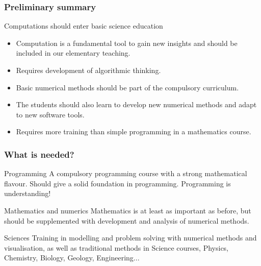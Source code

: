 \documentclass{beamer}
\begin{document}
\begin{frame}
\frametitle{Preliminary summary}

\begin{block}{Computations should enter basic science education }

\begin{itemize}
\item Computation is a fundamental tool to gain new insights and should be included in our elementary teaching.

\item Requires development of algorithmic thinking.

\item Basic numerical methods should be part of the compulsory curriculum.

\item The students should also learn to develop new numerical methods and adapt to new software tools.

\item Requires more training than simple programming in a mathematics course.
\end{itemize}

\noindent
\end{block}
\end{frame}

\begin{frame}
\frametitle{What is needed?}

\begin{block}{Programming }
A compulsory programming course with a strong mathematical flavour. Should give a solid foundation in programming. Programming is understanding!
\end{block}

\begin{block}{Mathematics and numerics }
Mathematics is at least as important as before, but should be supplemented with development and analysis of numerical methods.
\end{block}

\begin{block}{Sciences }
Training in modelling and problem solving with numerical methods and visualisation, as well as traditional methods in Science courses, Physics, Chemistry, Biology, Geology, Engineering...
\end{block}
\end{frame}
\end{document}

